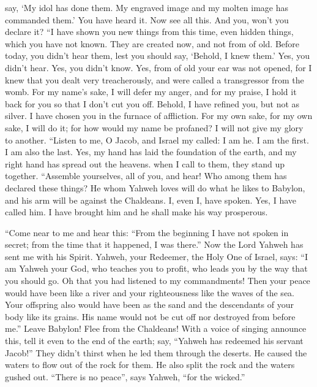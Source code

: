 say, `My idol has done them. My engraved image and my molten image has
commanded them.'  You have heard it. Now see all this. And
you, won't you declare it? ``I have shown you new things from this time,
even hidden things, which you have not known.  They are
created now, and not from of old. Before today, you didn't hear them,
lest you should say, `Behold, I knew them.'  Yes, you
didn't hear. Yes, you didn't know. Yes, from of old your ear was not
opened, for I knew that you dealt very treacherously, and were called a
transgressor from the womb.  For my name's sake, I will
defer my anger, and for my praise, I hold it back for you so that I
don't cut you off.  Behold, I have refined you, but not
as silver. I have chosen you in the furnace of affliction.
 For my own sake, for my own sake, I will do it; for how
would my name be profaned? I will not give my glory to another.
 ``Listen to me, O Jacob, and Israel my called: I am he.
I am the first. I am also the last.  Yes, my hand has
laid the foundation of the earth, and my right hand has spread out the
heavens. when I call to them, they stand up together. 
``Assemble yourselves, all of you, and hear! Who among them has declared
these things? He whom Yahweh loves will do what he likes to Babylon, and
his arm will be against the Chaldeans.  I, even I, have
spoken. Yes, I have called him. I have brought him and he shall make his
way prosperous.

 ``Come near to me and hear this: ``From the beginning I
have not spoken in secret; from the time that it happened, I was
there.'' Now the Lord Yahweh has sent me with his Spirit.
 Yahweh, your Redeemer, the Holy One of Israel, says: ``I
am Yahweh your God, who teaches you to profit, who leads you by the way
that you should go.  Oh that you had listened to my
commandments! Then your peace would have been like a river and your
righteousness like the waves of the sea.  Your offspring
also would have been as the sand and the descendants of your body like
its grains. His name would not be cut off nor destroyed from before
me.''  Leave Babylon! Flee from the Chaldeans! With a
voice of singing announce this, tell it even to the end of the earth;
say, ``Yahweh has redeemed his servant Jacob!''  They
didn't thirst when he led them through the deserts. He caused the waters
to flow out of the rock for them. He also split the rock and the waters
gushed out.  ``There is no peace'', says Yahweh, ``for
the wicked.''

